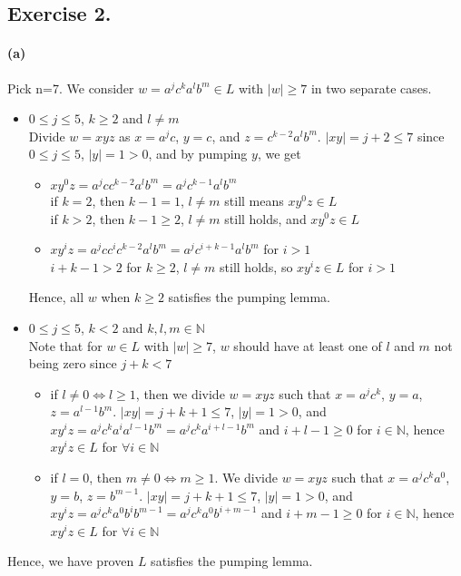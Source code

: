 \documentclass[12pt]{article}
\begin{document}
\subsection*{Exercise 2.} 
\paragraph*{(a)} Pick n=7. We consider \(w=a^jc^ka^lb^m \in L\) with \(|w| \geq 7\) in two separate cases.
\begin{itemize}
  \item \(0 \leq j \leq 5\), \(k \geq 2\) and \(l \neq m\)\\
  Divide \(w = xyz\) as \(x = a^jc\), \(y=c\), and \(z=c^{k-2}a^lb^m\). \(|xy| = j+2 \leq 7\) since \(0 \leq j \leq 5\), \(|y| = 1 > 0\), and by pumping \(y\), we get
  \begin{itemize}
    \item \(xy^0z = a^jcc^{k-2}a^lb^m = a^jc^{k-1}a^lb^m\)\\
    if \(k = 2\), then \(k-1 = 1\), \(l \neq m\) still means \(xy^0z \in L\)\\
    if \(k > 2\), then \(k-1 \geq 2\), \(l \neq m\) still holds, and \(xy^0z \in L\)
    \item \(xy^iz = a^jcc^ic^{k-2}a^lb^m = a^jc^{i+k-1}a^lb^m\) for \(i > 1\)\\
    \(i+k-1 > 2\) for \(k \geq 2\), \(l \neq m\) still holds, so \(xy^iz \in L\) for \(i > 1\)
  \end{itemize}
  Hence, all \(w\) when \(k \geq 2\) satisfies the pumping lemma.
  \item \(0 \leq j \leq 5\), \(k < 2\) and \(k, l, m \in \mathbb{N}\)\\
  Note that for \(w \in L\) with \(|w| \geq 7\), \(w\) should have at least one of \(l\) and \(m\) not being zero since \(j+k < 7\)
  \begin{itemize}
    \item if \(l \neq 0 \Leftrightarrow l \geq 1\), then we divide \(w = xyz\) such that \(x=a^jc^k\), \(y=a\), \(z=a^{l-1}b^m\). \(|xy|= j+k+1 \leq 7\), \(|y| = 1>0\), and \(xy^iz = a^jc^ka^ia^{l-1}b^m = a^jc^ka^{i+l-1}b^m\) and \(i+l-1 \geq 0\) for \(i \in \mathbb{N}\), hence \(xy^iz \in L\) for \(\forall i \in \mathbb{N}\)
    \item if \(l = 0\), then \(m \neq 0 \Leftrightarrow m \geq 1\). We divide \(w = xyz\) such that \(x = a^jc^ka^0\), \(y = b\), \(z = b^{m-1}\). \(|xy|= j+k+1 \leq 7\), \(|y| = 1>0\), and \(xy^iz = a^jc^ka^0b^ib^{m-1}= a^jc^ka^0b^{i+m-1}\) and \(i+m-1 \geq 0\) for \(i \in \mathbb{N}\), hence \(xy^iz \in L\) for \(\forall i \in \mathbb{N}\)
  \end{itemize}
\end{itemize}
Hence, we have proven \(L\) satisfies the pumping lemma.
\end{document}
